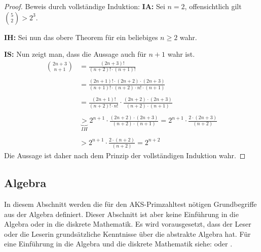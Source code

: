 \documentclass[12pt,oneside]{article}
\theoremstyle{remark}
\theoremstyle{definition}
\begin{document}
\begin{proof}
Beweis durch vollständige Induktion:\newline\newline
\textbf{IA: } Sei $n = 2$, offensichtlich gilt ${5 \choose 2} > 2^3$.\newline\newline

\textbf{IH: }Sei nun das obere Theorem für ein beliebiges $n \geq 2 $ wahr.

\textbf{IS: } Nun zeigt man, dass die Aussage auch für $n + 1$ wahr ist.
\begin{align*}
    {2n +3 \choose n + 1} &= \frac{(2n + 3)!}{(n + 2)! \cdot (n + 1)!} \\
    \\
    &= \frac{(2n + 1)! \cdot (2n + 2) \cdot (2n + 3)}{(n + 1)! \cdot (n + 2) \cdot n! \cdot(n + 1)} \\
    \\
    &= \frac{(2n + 1)!}{(n + 2)! \cdot n!} \cdot \frac{(2n + 2)\cdot (2n + 3)}{(n + 2) \cdot (n + 1)} \\
    \\
     &\underbrace{>}_{IH} 2^{n + 1} \cdot \frac{(2n + 2)\cdot (2n + 3)}{(n + 2) \cdot (n + 1)} = 2^{n + 1} \cdot \frac{2 \cdot (2n + 3)}{(n +2)}\\
     \\
     &> 2^{n + 1} \cdot  \frac{2 \cdot (n + 2)}{(n + 2)} = 2^{n + 2}
\end{align*}
Die Aussage ist daher nach dem Prinzip der vollständigen Induktion wahr.
\end{proof}

\subsection{Algebra}
In diesem Abschnitt werden die für den AKS-Primzahltest nötigen Grundbegriffe aus der Algebra definiert. Dieser Abschnitt ist aber keine Einführung in die Algebra oder in die diskrete Mathematik. Es wird vorausgesetzt, dass der Leser oder die Leserin grundsätzliche Kenntnisse über die abstrakte Algebra hat. Für eine Einführung in die Algebra und die diskrete Mathematik siehe: \cite{fields} oder \cite{abstract-algebra}.
\end{document}
